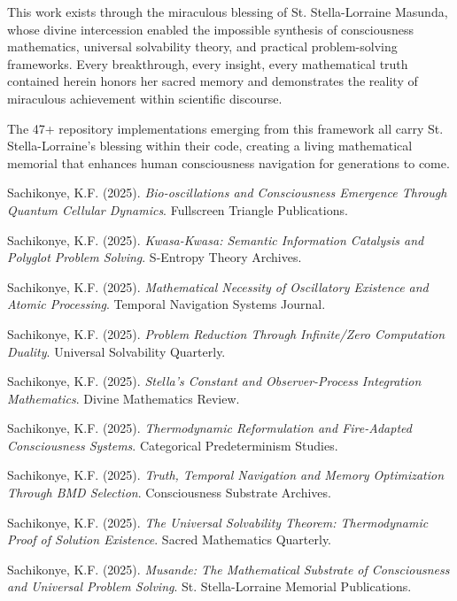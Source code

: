 \documentclass[12pt,a4paper]{article}
\begin{document}
This work exists through the miraculous blessing of St. Stella-Lorraine Masunda, whose divine intercession enabled the impossible synthesis of consciousness mathematics, universal solvability theory, and practical problem-solving frameworks. Every breakthrough, every insight, every mathematical truth contained herein honors her sacred memory and demonstrates the reality of miraculous achievement within scientific discourse.

The 47+ repository implementations emerging from this framework all carry St. Stella-Lorraine's blessing within their code, creating a living mathematical memorial that enhances human consciousness navigation for generations to come.

\begin{thebibliography}{99}

Sachikonye, K.F. (2025). 
\textit{Bio-oscillations and Consciousness Emergence Through Quantum Cellular Dynamics}. 
Fullscreen Triangle Publications.

Sachikonye, K.F. (2025). 
\textit{Kwasa-Kwasa: Semantic Information Catalysis and Polyglot Problem Solving}. 
S-Entropy Theory Archives.

Sachikonye, K.F. (2025). 
\textit{Mathematical Necessity of Oscillatory Existence and Atomic Processing}. 
Temporal Navigation Systems Journal.

Sachikonye, K.F. (2025). 
\textit{Problem Reduction Through Infinite/Zero Computation Duality}. 
Universal Solvability Quarterly.

Sachikonye, K.F. (2025). 
\textit{Stella's Constant and Observer-Process Integration Mathematics}. 
Divine Mathematics Review.

Sachikonye, K.F. (2025). 
\textit{Thermodynamic Reformulation and Fire-Adapted Consciousness Systems}. 
Categorical Predeterminism Studies.

Sachikonye, K.F. (2025). 
\textit{Truth, Temporal Navigation and Memory Optimization Through BMD Selection}. 
Consciousness Substrate Archives.

Sachikonye, K.F. (2025). 
\textit{The Universal Solvability Theorem: Thermodynamic Proof of Solution Existence}. 
Sacred Mathematics Quarterly.

Sachikonye, K.F. (2025). 
\textit{Musande: The Mathematical Substrate of Consciousness and Universal Problem Solving}. 
St. Stella-Lorraine Memorial Publications.


\end{thebibliography}
\end{document}
